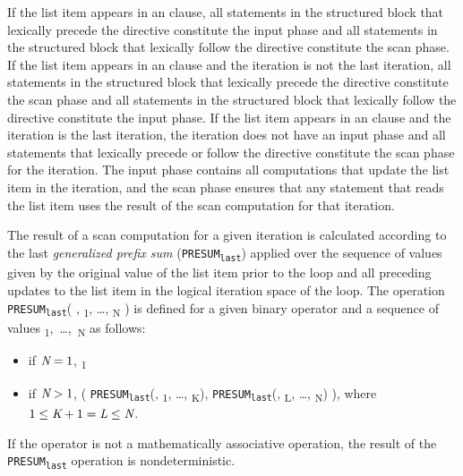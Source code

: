 If the list item appears in an  clause, all statements in the
structured block that lexically precede the directive constitute the input
phase and all statements in the structured block that lexically follow the
directive constitute the scan phase. If the list item appears in an
 clause and the iteration is not the last iteration, all
statements in the structured block that lexically precede the directive
constitute the scan phase and all statements in the structured block that
lexically follow the directive constitute the input phase. If the list item
appears in an  clause and the iteration is the last iteration,
the iteration does not have an input phase and all statements that lexically
precede or follow the directive constitute the scan phase for the iteration.
The input phase contains all computations that update the list item in the
iteration, and the scan phase ensures that any statement that reads the list
item uses the result of the scan computation for that iteration.

The result of a scan computation for a given iteration is calculated according
to the last \textit{generalized prefix sum}
(\texttt{PRESUM\textsubscript{last}}) applied over the sequence of values
given by the original value of the list item prior to the loop and all
preceding updates to the list
item in the logical iteration space of the loop. The operation
\texttt{PRESUM\textsubscript{last}}(
, \textsubscript{1}, \ldots, \textsubscript{N} ) is
defined for a given binary operator  and a sequence of  values
\mbox{\textsubscript{1}, \ldots, \textsubscript{N}} as follows:

\begin{itemize}

\item if $\plc{N} = 1$, \textsubscript{1}

\item if $\plc{N} > 1$, (
    \texttt{PRESUM\textsubscript{last}}(, \textsubscript{1},
    \ldots, \textsubscript{K}), \texttt{PRESUM\textsubscript{last}}(, \textsubscript{L}, \ldots, \textsubscript{N}) ), where $1 \leq \plc{K}+1 = \plc{L} \leq \plc{N}$.
\end{itemize}

If the operator  is not a mathematically associative operation, the result of
the \texttt{PRESUM\textsubscript{last}} operation is nondeterministic.

